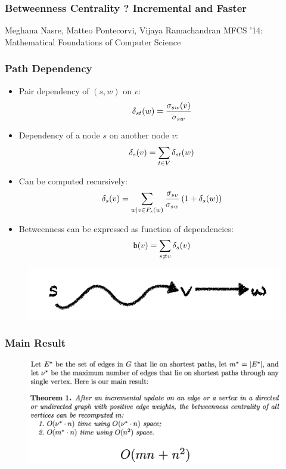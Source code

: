 \begin{frame}
  \frametitle{Betweenness Centrality ? Incremental and Faster}
  \centering
  \vfill
  {\huge Meghana Nasre, Matteo Pontecorvi, Vijaya Ramachandran}
  \vfill
  {\large MFCS '14: Mathematical Foundations of Computer Science}
\end{frame}

\begin{frame}
  \frametitle{Path Dependency}
  
  \begin{itemize}
    \item Pair dependency of $(s,w)$ on $v$:
      \[\delta_{st}(w)=\frac{\sigma_{sw}(v)}{\sigma_{sw}}\]
    \item Dependency of a node $s$ on another node $v$:
      \[\delta_s(v)=\sum_{t \in V}\delta_{st}(w)\]
    \item Can be computed recursively:
    \[
    \delta_s(v)=\sum_{w \mid v \in P_s(w) } \frac{\sigma_{sv}}{\sigma_{sw}} \left( 1 + \delta_{s}(w) \right)
    \]
    \item Betweenness can be expressed as function of dependencies:
      \[ \mathsf{b}(v) = \sum_{s \neq v} \delta_s(v) \]
  \end{itemize}
  
  \begin{figure}[H]
    \centering
    \includegraphics[scale=1]{imgs/path-dependency}
  \end{figure}
  
\end{frame}

\begin{frame}
  \frametitle{Main Result}

  \begin{figure}[H]
    \centering
    \includegraphics[width=\textwidth]{imgs/npr14-main-result}
  \end{figure}
  
\end{frame}

